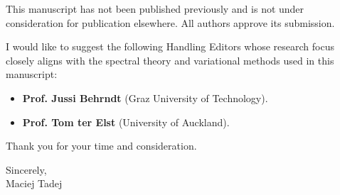 \documentclass[11pt, a4paper]{article}
\begin{document}
This manuscript has not been published previously and is not under consideration for publication elsewhere. All authors approve its submission.

I would like to suggest the following Handling Editors whose research focus closely aligns with the spectral theory and variational methods used in this manuscript:
\begin{itemize}
    \item \textbf{Prof. Jussi Behrndt} (Graz University of Technology).
    \item \textbf{Prof. Tom ter Elst} (University of Auckland).
\end{itemize}

Thank you for your time and consideration.

\vspace{1em}

\begin{flushright}
Sincerely, \\
Maciej Tadej
\end{flushright}
\end{document}
